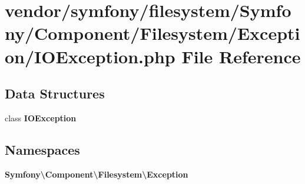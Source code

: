 \section{vendor/symfony/filesystem/\+Symfony/\+Component/\+Filesystem/\+Exception/\+I\+O\+Exception.php File Reference}
\label{symfony_2filesystem_2_symfony_2_component_2_filesystem_2_exception_2_io_exception_8php}
\subsection*{Data Structures}
\begin{DoxyCompactItemize}
\item 
class {\bf I\+O\+Exception}
\end{DoxyCompactItemize}
\subsection*{Namespaces}
\begin{DoxyCompactItemize}
\item 
 {\bf Symfony\textbackslash{}\+Component\textbackslash{}\+Filesystem\textbackslash{}\+Exception}
\end{DoxyCompactItemize}
